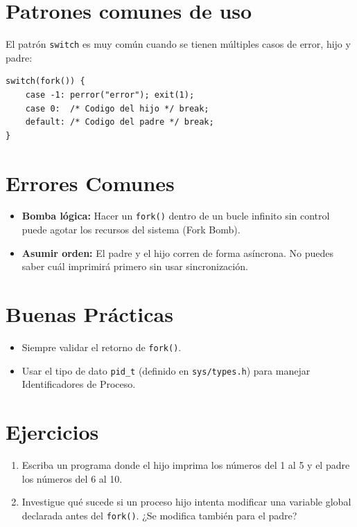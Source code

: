 \documentclass[12pt,a4paper]{article}
\begin{document}
\section{Patrones comunes de uso}
El patrón \texttt{switch} es muy común cuando se tienen múltiples casos de error, hijo y padre:
\begin{lstlisting}
switch(fork()) {
    case -1: perror("error"); exit(1);
    case 0:  /* Codigo del hijo */ break;
    default: /* Codigo del padre */ break;
}
\end{lstlisting}

\section{Errores Comunes}
\begin{itemize}
    \item \textbf{Bomba lógica:} Hacer un \texttt{fork()} dentro de un bucle infinito sin control puede agotar los recursos del sistema (Fork Bomb).
    \item \textbf{Asumir orden:} El padre y el hijo corren de forma asíncrona. No puedes saber cuál imprimirá primero sin usar sincronización.
\end{itemize}

\section{Buenas Prácticas}
\begin{itemize}
    \item Siempre validar el retorno de \texttt{fork()}.
    \item Usar el tipo de dato \texttt{pid\_t} (definido en \texttt{sys/types.h}) para manejar Identificadores de Proceso.
\end{itemize}

\section{Ejercicios}
\begin{enumerate}
    \item Escriba un programa donde el hijo imprima los números del 1 al 5 y el padre los números del 6 al 10.
    \item Investigue qué sucede si un proceso hijo intenta modificar una variable global declarada antes del \texttt{fork()}. ¿Se modifica también para el padre?
\end{enumerate}
\end{document}
